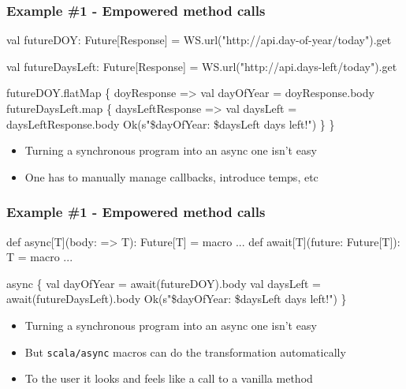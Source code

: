 \documentclass[svgnames,hyperref={bookmarks=false}]{beamer}
\begin{document}
\begin{frame}[fragile, t]
\frametitle{Example \#1 - Empowered method calls}

\begin{semiverbatim}
val futureDOY: Future[Response] =
  WS.url("http://api.day-of-year/today").get

val futureDaysLeft: Future[Response] =
  WS.url("http://api.days-left/today").get

futureDOY.flatMap \{ doyResponse =>
  val dayOfYear = doyResponse.body
  futureDaysLeft.map \{ daysLeftResponse =>
    val daysLeft = daysLeftResponse.body
    Ok(s"\$dayOfYear: \$daysLeft days left!")
  \}
\}
\end{semiverbatim}

\begin{itemize}
\item Turning a synchronous program into an async one isn't easy
\item One has to manually manage callbacks, introduce temps, etc
\end{itemize}
\end{frame}

\begin{frame}[fragile, t]
\frametitle{Example \#1 - Empowered method calls}

\begin{semiverbatim}
\alert{def async[T](body: => T): Future[T] = macro ...}
\alert{def await[T](future: Future[T]): T = macro ...}

\alert{async \{}
  val dayOfYear = \alert{await(}futureDOY\alert{)}.body
  val daysLeft = \alert{await(}futureDaysLeft\alert{)}.body
  Ok(s"\$dayOfYear: \$daysLeft days left!")
\alert{\}}



\end{semiverbatim}

\begin{itemize}
\item Turning a synchronous program into an async one isn't easy
\item But \texttt{scala/async} macros can do the transformation automatically
\item To the user it looks and feels like a call to a vanilla method
\end{itemize}
\end{frame}
\end{document}
